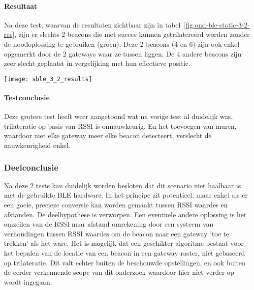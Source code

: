 \paragraph{Resultaat}
\begin{minipage}{0.55\textwidth}
Na deze test, waarvan de resultaten zichtbaar zijn in tabel~\ref{fig:ond-ble-static-3-2-res}, zijn er slechts 2 beacons die met succes kunnen getrilatereerd worden zonder de noodoplossing te gebruiken (groen). Deze 2 beacons (4 en 6) zijn ook enkel opgemerkt door de 2 gateways waar ze tussen liggen. De 4 andere beacons zijn zeer slecht geplaatst in vergelijking met hun effectieve positie.
\end{minipage}
\hfill
\begin{minipage}{0.42\textwidth}
	\texttt{[image: sble\_3\_2\_results]}
	\label{fig:ond-ble-static-3-2-res}
\end{minipage}

\paragraph{Testconclusie}
Deze grotere test heeft weer aangetoond wat na vorige test al duidelijk was, trilateratie op basis van RSSI is onnauwkeurig. En het toevoegen van muren, waardoor niet elke gateway meer elke beacon detecteert, verslecht de nauwkeurigheid enkel.

\subsubsection{Deelconclusie}
Na deze 2 tests kan duidelijk worden besloten dat dit scenario niet haalbaar is met de gebruikte BLE hardware. In het principe zit potentieel, maar enkel als er een goeie, precieze conversie kan worden gemaakt tussen RSSI waardes en afstanden. De deelhypothese is verworpen.
Een eventuele andere oplossing is het omzeilen van de RSSI naar afstand omrekening door een systeem van verhoudingen tussen RSSI waardes om de beacon naar een gateway 'toe te trekken' als het ware. Het is mogelijk dat een geschikter algoritme bestaat voor het bepalen van de locatie van een beacon in een gateway raster, niet gebaseerd op trilateratie. Dit valt echter buiten de beschouwde opstellingen, en ook buiten de eerder verkennende scope van dit onderzoek waardoor hier niet verder op wordt ingegaan.

